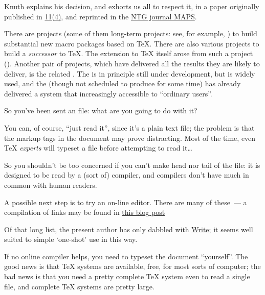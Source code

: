 Knuth explains his decision, and exhorts us all to respect it, in a
paper originally published in %
\href{http://tug.org/TUGboat/Articles/tb11-4/tb30knut.pdf}{\TUGboat{} 11(4)},
and reprinted in the %
\href{http://www.ntg.nl/maps/pdf/5_34.pdf}{NTG journal MAPS}.

There are projects (some of them long-term
projects: see, for example,
)
to build substantial new macro packages based on \TeX{}.  There are
also various projects to build a \emph{successor} to \TeX{}.  The
 extension to \TeX{} itself arose from such a
project ().  Another pair of projects, which have delivered
all the results they are likely to deliver, is the
related %
.  The %
 is in principle still under
development, but is widely used, and the %
 (though not scheduled to produce
for some time) has already delivered a system that increasingly
accessible to ``ordinary users''.


So you've been sent an \AllTeX{} file: what are you going to do with
it?

You can, of course, ``just read it'', since it's a plain text file;
the problem is that the markup tags in the document may prove
distracting.  Most of the time, even \TeX{} \emph{experts} will
typeset a \AllTeX{} file before attempting to read it\nobreakspace{}\dots{}

So you shouldn't be too concerned if you can't make head nor tail of
the file: it is designed to be read by a (sort of) compiler, and
compilers don't have much in common with human readers.

A possible next step is to try an on-line \latex{} editor.  There are
many of these~--- a compilation of links may be found in %
\href{http://texblog.net/latex-link-archive/online-compiler/}{this blog post}

Of that long list, the present author has only dabbled with 
\href{https://www.writelatex.com/}{Write\latex{}}; it seems well
suited to simple `one-shot' use in this way.

If no online compiler helps, you need to typeset the document
``yourself''.  The good news is that \TeX{} systems are available,
free, for most sorts of computer; the bad news is that you need a
pretty complete \TeX{} system even to read a single file, and complete
\TeX{} systems are pretty large.

